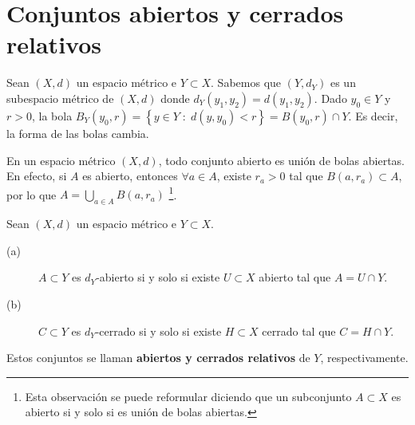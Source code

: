 \section{Conjuntos abiertos y cerrados relativos}
\begin{observation}
Sean $\displaystyle \left(X,d\right) $ un espacio métrico e $\displaystyle Y \subset X $. Sabemos que $\displaystyle \left(Y, d _{Y}\right) $ es un subespacio métrico de $\displaystyle \left(X,d\right) $ donde $\displaystyle d _{Y}\left(y_{1}, y_{2}\right) = d\left(y_{1}, y_{2}\right) $. 
Dado $\displaystyle y_{0} \in Y $ y $\displaystyle r > 0 $, la bola $\displaystyle B_{Y}\left(y_{0}, r\right) = \left\{ y \in Y \; : \; d\left(y, y_{0}\right)<r\right\} = B\left(y_{0}, r\right) \cap Y $. Es decir, la forma de las bolas cambia.
\end{observation}
\begin{observation}
En un espacio métrico $\displaystyle \left(X,d\right) $, todo conjunto abierto es unión de bolas abiertas. En efecto, si $\displaystyle A $ es abierto, entonces $\displaystyle \forall a \in A $, existe $\displaystyle r_{a} > 0 $ tal que $\displaystyle B\left(a,r_{a}\right) \subset A $, por lo que $\displaystyle A = \bigcup_{ a \in A}B\left(a,r_{a}\right) $ \footnote{Esta observación se puede reformular diciendo que un subconjunto $\displaystyle A \subset X $ es abierto si y solo si es unión de bolas abiertas.}.
\end{observation}
\begin{prop}
Sean $\displaystyle \left(X,d\right) $ un espacio métrico e $\displaystyle Y \subset X $. 
\begin{description}
\item[(a)] $\displaystyle A \subset Y $ es $\displaystyle d _{Y} $-abierto si y solo si existe $\displaystyle U \subset X $ abierto tal que $\displaystyle A = U \cap Y $.
\item[(b)] $\displaystyle C \subset Y $ es $\displaystyle d _{Y} $-cerrado si y solo si existe $\displaystyle H \subset X $ cerrado tal que $\displaystyle C = H \cap Y $.
\end{description}
Estos conjuntos se llaman \textbf{abiertos y cerrados relativos} de $\displaystyle Y $, respectivamente.
\end{prop}
